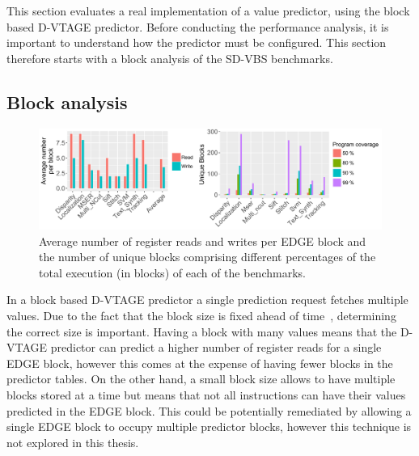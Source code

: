 This section evaluates a real implementation of a value predictor, using the block based D-VTAGE predictor.
Before conducting the performance analysis, it is important to understand how the predictor must be configured.
This section therefore starts with a block analysis of the SD-VBS benchmarks.

\subsection{Block analysis}
\begin{figure}[t]
    \centering
    \includegraphics[width=1\textwidth]{chapter3/graphics/joint.pdf}

    \caption{Average number of register reads and writes per EDGE block and the number of unique blocks comprising different percentages of the total execution (in blocks) of each of the benchmarks.}
    \label{fig:edge_reg_read}
	\vspace{1em}
\end{figure}

In a block based D-VTAGE predictor a single prediction request fetches multiple values.
Due to the fact that the block size is fixed ahead of time~\cite{peraisBeBop2015}, determining the correct size is important.
Having a block with many values means that the D-VTAGE predictor can predict a higher number of register reads for a single EDGE block, however this comes at the expense of having fewer blocks in the predictor tables.
On the other hand, a small block size allows to have multiple blocks stored at a time but means that not all instructions can have their values predicted in the EDGE block.
This could be potentially remediated by allowing a single EDGE block to occupy multiple predictor blocks, however this technique is not explored in this thesis.


